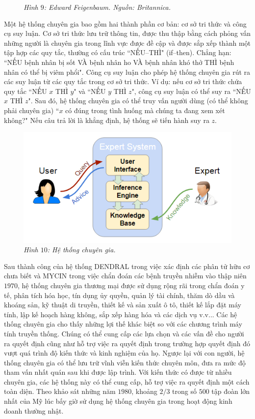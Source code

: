 \begin{multicols}{2}
\begin{figure}[H]
		\caption{\small\textit{\color{cackithi}Hình $9$: Edward Feigenbaum. Nguồn: Britannica.}}
		\vspace*{-10pt}
	\end{figure}
	Một hệ thống chuyên gia bao gồm hai thành phần cơ bản: cơ sở tri thức và công cụ suy luận. Cơ sở tri thức lưu trữ thông tin, được thu thập bằng cách phỏng vấn những người là chuyên gia trong lĩnh vực được đề cập và được sắp xếp thành một tập hợp các quy tắc, thường có cấu trúc ``NẾU--THÌ" (if--then). Chẳng hạn: ``NẾU bệnh nhân bị sốt VÀ bệnh nhân ho VÀ bệnh nhân khó thở THÌ bệnh nhân có thể bị viêm phổi". Công cụ suy luận cho phép hệ thống chuyên gia rút ra các suy luận từ các quy tắc trong cơ sở tri thức. Ví dụ: nếu cơ sở tri thức chứa quy tắc ``NẾU $x$ THÌ $y$" và ``NẾU $y$ THÌ $z$", công cụ suy luận có thể suy ra ``NẾU $x$ THÌ $z$". Sau đó, hệ thống chuyên gia có thể truy vấn người dùng (có thể không phải chuyên gia) ``$x$ có đúng trong tình huống mà chúng ta đang xem xét không?" Nếu câu trả lời là khẳng định, hệ thống sẽ tiến hành suy ra $z$.
	\begin{figure}[H]
		\vspace*{-5pt}
		\centering
		\captionsetup{labelformat= empty, justification=centering}
		\includegraphics[width= 0.9\linewidth]{Expert_System.png}
		\caption{\small\textit{\color{cackithi}Hình $10$: Hệ thống chuyên gia.}}
		\vspace*{-10pt}
	\end{figure}
	Sau thành công của hệ thống DENDRAL trong việc xác định các phân tử hữu cơ chưa biết và MYCIN trong việc chẩn đoán các bệnh truyền nhiễm vào thập niên $1970$, hệ thống chuyên gia thương mại được sử dụng rộng rãi trong chẩn đoán y tế, phân tích hóa học, tín dụng ủy quyền, quản lý tài chính, thăm dò dầu và khoáng sản, kỹ thuật di truyền, thiết kế và sản xuất ô tô, thiết kế lắp đặt máy tính, lập kế hoạch hàng không, sắp xếp hàng hóa và các dịch vụ v.v... Các hệ thống chuyên gia cho thấy những lợi thế khác biệt so với các chương trình máy tính truyền thống. Chúng có thể  cung cấp các lựa chọn và các vấn đề cho người ra quyết định cũng như hỗ trợ việc ra quyết định trong trường hợp quyết định đó vượt quá trình độ kiến thức và kinh nghiệm của họ. Ngược lại với con người, hệ thống chuyên gia có thể  lưu trữ vĩnh viễn kiến thức chuyên môn, đưa ra mức độ tham vấn nhất quán sau khi được lập trình. Với kiến thức có được từ nhiều chuyên gia, các hệ thống này có thể cung cấp, hỗ trợ việc ra quyết định một cách toàn diện. Theo khảo sát những năm $1980$, khoảng $2/3$ trong số $500$ tập đoàn lớn nhất của Mỹ lúc bấy giờ sử dụng hệ thống chuyên gia trong hoạt động kinh doanh thường nhật.

\end{multicols}

